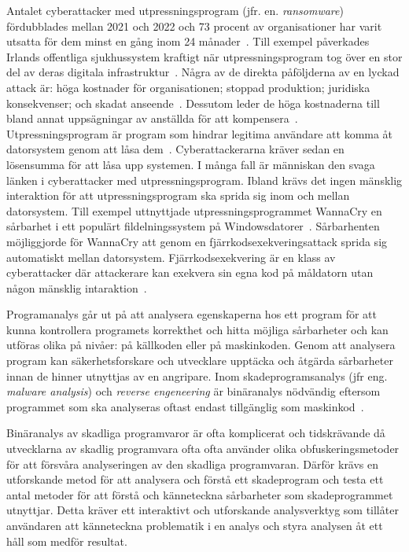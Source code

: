 Antalet cyberattacker med utpressningsprogram (jfr. en. \emph{ransomware}) fördubblades mellan 2021 och 2022 och 73 procent av organisationer har varit utsatta för dem minst en gång inom 24 månader~\cite{cyberreason2021, cyberreason2022}.
Till exempel påverkades Irlands offentliga sjukhussystem kraftigt när utpressningsprogram tog över en stor del av deras digitala infrastruktur~\cite{hse_report, gallagher2023}.
Några av de direkta påföljderna av en lyckad attack är: höga kostnader för organisationen; stoppad produktion; juridiska konsekvenser; och skadat anseende~\cite{cyberreason2021, cyberreason2022}.
Dessutom leder de höga kostnaderna till bland annat uppsägningar av anställda för att kompensera~\cite{cyberreason2021, cyberreason2022}.
Utpressningsprogram är program som hindrar legitima användare att komma åt datorsystem genom att låsa dem~\cite{accessscience_computer_virus}.
Cyberattackerarna kräver sedan en lösensumma för att låsa upp systemen.
I många fall är människan den svaga länken i cyberattacker med utpressningsprogram.
Ibland krävs det ingen mänsklig interaktion för att utpressningsprogram ska sprida sig inom och mellan datorsystem.
Till exempel uttnyttjade utpressningsprogrammet WannaCry en sårbarhet i ett populärt fildelningssystem på Windowsdatorer~\cite{alraddadicomprehensive}.
Sårbarhenten möjliggjorde för WannaCry att genom en fjärrkodsexekveringsattack sprida sig automatiskt mellan datorsystem.
Fjärrkodsexekvering är en klass av cyberattacker där attackerare kan exekvera sin egna kod på måldatorn utan någon mänsklig intaraktion~\cite{baker2022}.

Programanalys går ut på att analysera egenskaperna hos ett program för att kunna kontrollera programets korrekthet och hitta möjliga sårbarheter och kan utföras olika på nivåer: på källkoden eller på maskinkoden.
Genom att analysera program kan säkerhetsforskare och utvecklare upptäcka och åtgärda sårbarheter innan de hinner utnyttjas av en angripare.
Inom skadeprogramsanalys (jfr eng. \emph{malware analysis}) och \emph{reverse engeneering} är binäranalys nödvändig eftersom programmet som ska analyseras oftast endast tillgänglig som maskinkod~\cite{andriesse2018}.

Binäranalys av skadliga programvaror är ofta komplicerat och tidskrävande då utvecklarna av skadlig programvara ofta ofta använder olika obfuskeringsmetoder för att försvåra analyseringen av den skadliga programvaran.
Därför krävs en utforskande metod för att analysera och förstå ett skadeprogram och testa ett antal metoder för att förstå och känneteckna sårbarheter som skadeprogrammet utnyttjar.
Detta kräver ett interaktivt och utforskande analysverktyg som tillåter användaren att känneteckna problematik i en analys och styra analysen åt ett håll som medför resultat.

